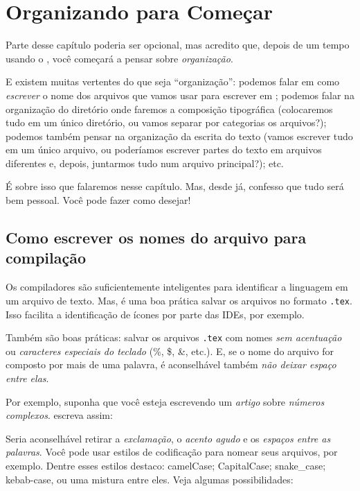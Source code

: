 \chapter{Organizando para Começar} 
\label{cap:organizando} 


Parte desse capítulo poderia ser opcional, mas acredito que, depois de um tempo 
usando o \LaTeXX, você começará a pensar sobre \textit{organização}. 

E existem muitas vertentes do que seja ``organização'': podemos falar em como 
\textit{escrever} o nome dos arquivos que vamos usar para escrever em \LaTeXX;
podemos falar na organização do diretório onde faremos a composição tipográfica
(colocaremos tudo em um único diretório, ou vamos separar por categorias os 
arquivos?); podemos também pensar na organização da escrita do texto (vamos 
escrever tudo em um único arquivo, ou poderíamos escrever partes do texto em 
arquivos diferentes e, depois, juntarmos tudo num arquivo principal?); etc. 

É sobre isso que falaremos nesse capítulo. 
Mas, desde já, confesso que tudo será bem pessoal. 
Você pode fazer como desejar!

\section{Como escrever os nomes do arquivo para compilação} %

Os compiladores são suficientemente inteligentes para identificar a linguagem 
{ \grega {} } em um arquivo de texto. 
Mas, é uma boa prática salvar os arquivos no formato \texttt{.tex}. 
Isso facilita a identificação de ícones por parte das IDEs, por exemplo.

Também são boas práticas: salvar os arquivos \texttt{.tex} com nomes 
\textit{sem acentuação} ou \textit{caracteres especiais do teclado} (\%, \$, \&, etc.). 
E, se o nome do arquivo for composto por mais de uma palavra, é aconselhável 
também \textit{não deixar espaço entre elas}.

Por exemplo, suponha que você esteja escrevendo um \textit{artigo} sobre 
\textit{números complexos}.  escreva assim: 


Seria aconselhável retirar a \textit{exclamação}, o \textit{acento agudo} e os 
\textit{espaços entre as palavras}. 
Você pode usar estilos de codificação para nomear seus arquivos, por exemplo. 
Dentre esses estilos destaco: \textsf{camelCase}; \textsf{CapitalCase}; 
\textsf{snake\_case}; \textsf{kebab-case}, ou uma mistura entre eles. 
Veja algumas possibilidades:

